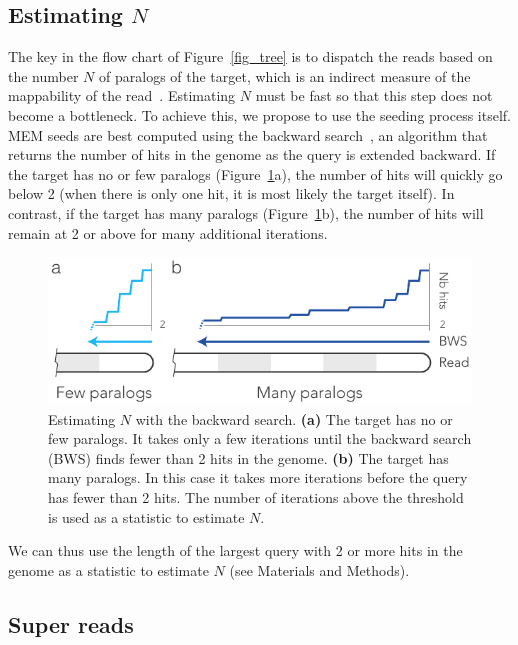 \documentclass[a4,center,fleqn]{NAR}
\begin{document}
\subsection{Estimating $N$}
\label{sec_N}

The key in the flow chart of Figure~\ref{fig_tree} is to dispatch the
reads based on the number $N$ of paralogs of the target, which is an
indirect measure of the mappability of the read~\cite{pmid22276185}.
Estimating $N$ must be fast so that this step does not become a
bottleneck. To achieve this, we propose to use the seeding process itself.
MEM seeds are best computed using the backward
search~\cite{ferragina2000opportunistic}, an algorithm that returns the
number of hits in the genome as the query is extended backward. If the
target has no or few paralogs (Figure~\ref{fig_back}a), the number of hits
will quickly go below 2 (when there is only one hit, it is most likely the
target itself). In contrast, if the target has many paralogs
(Figure~\ref{fig_back}b), the number of hits will remain at 2 or above for
many additional iterations.

\begin{figure}[t]
\begin{center}
\includegraphics[scale=.84]{pushing_backward.pdf}
\end{center}
\caption{Estimating $N$ with the backward search. \textbf{(a)} The target
has no or few paralogs. It takes only a few iterations until the backward
search (BWS) finds fewer than 2 hits in the genome. \textbf{(b)} The
target has many paralogs. In this case it takes more iterations before the
query has fewer than 2 hits. The number of iterations above the threshold
is used as a statistic to estimate $N$.}
\label{fig_back}
\end{figure}

We can thus use the length of the largest query with 2 or more hits in the
genome as a statistic to estimate $N$ (see Materials and Methods).


\subsection{Super reads}
\label{sec_super}
\end{document}
